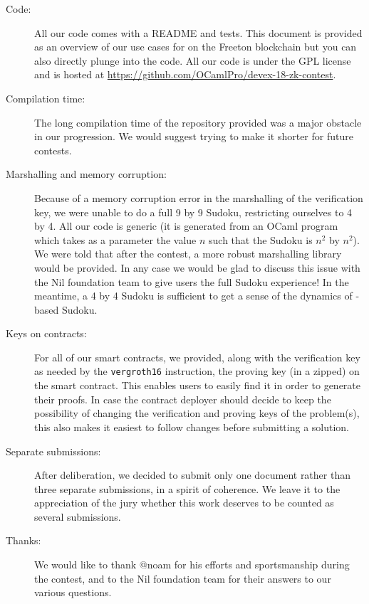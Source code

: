 \documentclass[10pt,a4paper]{article}
\begin{document}
\begin{description}
	\item[Code:] All our code comes with a README and tests. This document is provided as an overview of our use cases for \zksnarks{} on the Freeton blockchain but you can also directly plunge into the code. All our code is under the GPL license and is hosted at \url{https://github.com/OCamlPro/devex-18-zk-contest}.

	\item[Compilation time:] The long compilation time of the repository provided was a major obstacle in our progression. We would suggest trying to make it shorter for future contests.

	\item[Marshalling and memory corruption:] Because of a memory corruption error in the marshalling of the verification key, we were unable to do a full 9 by 9 Sudoku, restricting ourselves to 4 by 4. All our code is generic (it is generated from an OCaml program which takes as a parameter the value $n$ such that the Sudoku is $n^2$ by $n^2$). We were told that after the contest, a more robust marshalling library would be provided. In any case we would be glad to discuss this issue with the Nil foundation team to give users the full Sudoku experience! In the meantime, a 4 by 4 Sudoku is sufficient to get a sense of the dynamics of \zksnark-based Sudoku.

	\item[Keys on contracts: ] For all of our smart contracts, we provided, along with the verification key as needed by the \verb|vergroth16| instruction, the proving key (in a zipped) on the smart contract. This enables users to easily find it in order to generate their proofs. In case the contract deployer should decide to keep the possibility of changing the verification and proving keys of the problem(s), this also makes it easiest to follow changes before submitting a solution.

    \item[Separate submissions:] After deliberation, we decided to submit only one document rather than three separate submissions, in a spirit of coherence. We leave it to the appreciation of the jury whether this work deserves to be counted as several submissions.

	\item[Thanks:] We would like to thank @noam for his efforts and sportsmanship during the contest, and to the Nil foundation team for their answers to our various questions.
\end{description}
\end{document}
